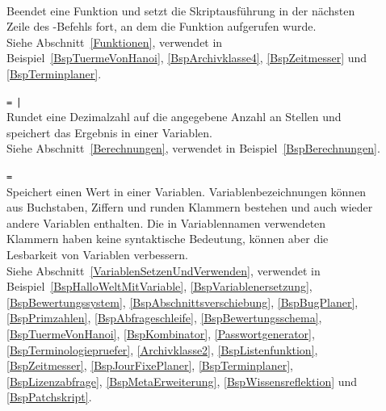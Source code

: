 \begin{description}
\item[]\mbox{}\\
Beendet eine Funktion und setzt die Skriptausführung in der nächsten Zeile des -Befehls fort, an dem die Funktion aufgerufen wurde.\\
Siehe Abschnitt~\ref{Funktionen}, verwendet in Beispiel~\ref{BspTuermeVonHanoi}, \ref{BspArchivklasse4}, \ref{BspZeitmesser} und \ref{BspTerminplaner}.

\item[]  \verb|=|  \verb=|= \\
Rundet eine Dezimalzahl auf die angegebene Anzahl an Stellen und speichert das Ergebnis in einer Variablen.\\
Siehe Abschnitt~\ref{Berechnungen}, verwendet in Beispiel~\ref{BspBerechnungen}.

\item[]  \verb|=| \\
Speichert einen Wert in einer Variablen. Variablenbezeichnungen können aus Buchstaben, Ziffern und runden Klammern bestehen und auch wieder andere Variablen enthalten. Die in Variablennamen verwendeten Klammern haben keine syntaktische Bedeutung, können aber die Lesbarkeit von Variablen verbessern.\\
Siehe Abschnitt~\ref{VariablenSetzenUndVerwenden}, verwendet in Beispiel~\ref{BspHalloWeltMitVariable}, \ref{BspVariablenersetzung}, \ref{BspBewertungssystem}, \ref{BspAbschnittsverschiebung}, \ref{BspBugPlaner}, \ref{BspPrimzahlen}, \ref{BspAbfrageschleife}, \ref{BspBewertungsschema}, \ref{BspTuermeVonHanoi}, \ref{BspKombinator}, \ref{Passwortgenerator}, \ref{BspTerminologiepruefer}, \ref{Archivklasse2}, \ref{BspListenfunktion}, \ref{BspZeitmesser}, \ref{BspJourFixePlaner}, \ref{BspTerminplaner}, \ref{BspLizenzabfrage}, \ref{BspMetaErweiterung}, \ref{BspWissensreflektion} und \ref{BspPatchskript}.


\end{description}

